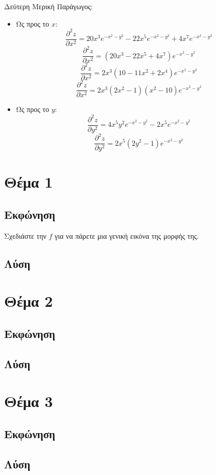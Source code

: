 \documentclass{report}
\begin{document}
Δεύτερη Μερική Παράγωγος:
\begin{itemize}
    \item Ως προς το $x$:
    $$\frac{\partial^2{z}}{\partial{x^2}} = 20x^{3}e^{-x^2-y^2}-22x^{5}e^{-x^2-y^2}+4x^{7}e^{-x^2-y^2}$$
    $$\frac{\partial^2{z}}{\partial{x^2}} = (20x^3 -22x^5 +4x^7)e^{-x^2-y^2}$$
    $$\frac{\partial^2{z}}{\partial{x^2}} = 2x^3(10-11x^2+2x^4)e^{-x^2-y^2}$$
    $$\frac{\partial^2{z}}{\partial{x^2}} = 2x^3(2x^2-1)(x^2-10)e^{-x^2-y^2}$$
    \item Ως προς το $y$:
    $$\frac{\partial^2{z}}{\partial{y^2}} = 4x^{5}y^{2}e^{-x^2-y^2} - 2x^{5}e^{-x^2-y^2}$$
    $$\frac{\partial^2{z}}{\partial{y^2}} = 2x^{5}(2y^2-1)e^{-x^2-y^2}$$
\end{itemize}

\chapter{Θέμα 1}
\section{Εκφώνηση}
Σχεδιάστε την $f$ για να πάρετε μια γενική εικόνα της μορφής της.
\section{Λύση}



%  
\chapter{Θέμα 2}
\section{Εκφώνηση}

\section{Λύση}


% 
\chapter{Θέμα 3}
\section{Εκφώνηση}

\section{Λύση}
\end{document}
